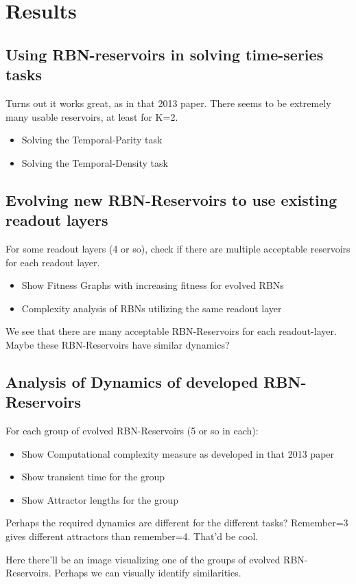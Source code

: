 \section{Results}

\subsection{Using RBN-reservoirs in solving time-series tasks}

Turns out it works great, as in that 2013 paper.
There seems to be extremely many usable reservoirs, at least for K=2.

\begin{itemize}
  \item Solving the Temporal-Parity task
  \item Solving the Temporal-Density task
\end{itemize}

\subsection{Evolving new RBN-Reservoirs to use existing readout layers}

For some readout layers (4 or so), check if there are multiple acceptable reservoirs for each readout layer.

\begin{itemize}
  \item Show Fitness Graphs with increasing fitness for evolved RBNs
  \item Complexity analysis of RBNs utilizing the same readout layer
\end{itemize}

We see that there are many acceptable RBN-Reservoirs for each readout-layer.
Maybe these RBN-Reservoirs have similar dynamics?


\subsection{Analysis of Dynamics of developed RBN-Reservoirs}

For each group of evolved RBN-Reservoirs (5 or so in each):

\begin{itemize}
  \item Show Computational complexity measure as developed in that 2013 paper
  \item Show transient time for the group
  \item Show Attractor lengths for the group
\end{itemize}


Perhaps the required dynamics are different for the different tasks?
Remember=3 gives different attractors than remember=4. That'd be cool.


Here there'll be an image visualizing one of the groups of evolved RBN-Reservoirs.
Perhaps we can visually identify similarities.
